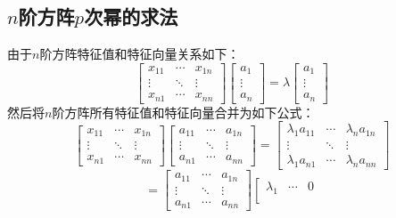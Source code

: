 \documentclass[12pt]{article}
\begin{document}
\begin{CJK}{UTF8}{gbsn}
\section{$n$阶方阵$p$次幂的求法}
由于$n$阶方阵特征值和特征向量关系如下：
\begin{equation}
\left[
\begin{array}{ccc}
x_{11} & \cdots & x_{1n}\\
\vdots & \ddots & \vdots\\
x_{n1} & \cdots & x_{nn}
\end{array}
\right]
\left[
\begin{array}{c}
a_1\\
\vdots\\
a_n
\end{array}
\right]
=\lambda
\left[
\begin{array}{c}
a_1\\
\vdots\\
a_n
\end{array}
\right]
\end{equation}
然后将$n$阶方阵所有特征值和特征向量合并为如下公式：
\begin{equation}
\left[
\begin{array}{ccc}
x_{11} & \cdots & x_{1n}\\
\vdots & \ddots & \vdots\\
x_{n1} & \cdots & x_{nn}
\end{array}
\right]
\left[
\begin{array}{ccc}
a_{11} & \cdots & a_{1n}\\
\vdots & \ddots & \vdots\\
a_{n1} & \cdots & a_{nn}
\end{array}
\right]
=
\left[
\begin{array}{ccc}
\lambda_1a_{11} & \cdots & \lambda_na_{1n}\\
\vdots & \ddots & \vdots\\
\lambda_1a_{n1} & \cdots & \lambda_na_{nn}
\end{array}
\right]
\end{equation}
\begin{equation}
=
\left[
\begin{array}{ccc}
a_{11} & \cdots & a_{1n}\\
\vdots & \ddots & \vdots\\
a_{n1} & \cdots & a_{nn}
\end{array}
\right]
\left[
\begin{array}{ccc}
\lambda_1 & \cdots & 0\\

\end{array}
\end{equation}
\end{CJK}
\end{document}
